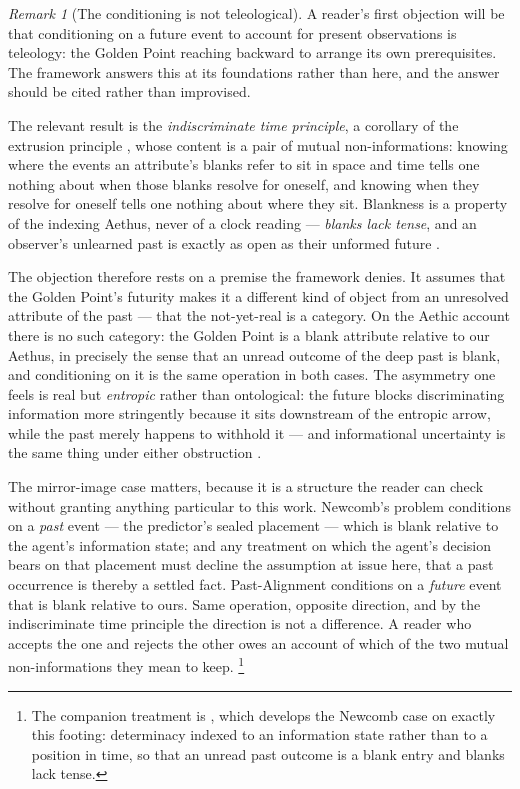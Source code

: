 \documentclass[11pt]{article}
\numberwithin{equation}{section}
\theoremstyle{plain}
\theoremstyle{definition}
\theoremstyle{remark}
\newtheorem{remark}[theorem]{Remark}
\begin{document}
\begin{remark}[The conditioning is not teleological]
\label{gc:rem:teleology}
A reader's first objection will be that conditioning on a future event
to account for present observations is teleology: the Golden Point
reaching backward to arrange its own prerequisites. The framework
answers this at its foundations rather than here, and the answer should
be cited rather than improvised.

The relevant result is the \emph{indiscriminate time principle}, a
corollary of the extrusion principle \cite{Aethus}, whose content is a
pair of mutual non-informations: knowing where the events an attribute's
blanks refer to sit in space and time tells one nothing about when those
blanks resolve for oneself, and knowing when they resolve for oneself
tells one nothing about where they sit. Blankness is a property of the
indexing Aethus, never of a clock reading --- \emph{blanks lack tense},
and an observer's unlearned past is exactly as open as their unformed
future \cite{AethusBrief}.

The objection therefore rests on a premise the framework denies. It
assumes that the Golden Point's futurity makes it a different kind of
object from an unresolved attribute of the past --- that the not-yet-real
is a category. On the Aethic account there is no such category: the
Golden Point is a blank attribute relative to our Aethus, in precisely
the sense that an unread outcome of the deep past is blank, and
conditioning on it is the same operation in both cases. The asymmetry
one feels is real but \emph{entropic} rather than ontological: the
future blocks discriminating information more stringently because it
sits downstream of the entropic arrow, while the past merely happens to
withhold it --- and informational uncertainty is the same thing under
either obstruction \cite{Aethus}.

The mirror-image case matters, because it is a structure the
reader can check without granting anything particular to this work.
Newcomb's problem conditions on a \emph{past} event --- the predictor's
sealed placement --- which is blank relative to the agent's information
state; and any treatment on which the agent's decision bears on that
placement must decline the assumption at issue here, that a past
occurrence is thereby a settled fact. Past-Alignment conditions on a
\emph{future} event that is blank relative to ours. Same operation,
opposite direction, and by the indiscriminate time principle the
direction is not a difference. A reader who accepts the one and rejects
the other owes an account of which of the two mutual non-informations
they mean to keep.%
\footnote{The companion treatment is \cite{AethusDecision}, which develops
the Newcomb case on exactly this footing: determinacy indexed to an
information state rather than to a position in time, so that an unread past
outcome is a blank entry and blanks lack tense.}


\end{remark}
\end{document}
